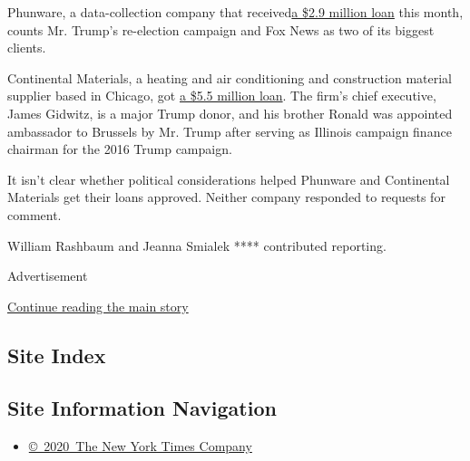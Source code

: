 Phunware, a data-collection company that
received\href{https://investors.phunware.com/news-events/press-releases/detail/96/phunware-receives-united-states-small-business}{a
\$2.9 million loan} this month, counts Mr. Trump's re-election campaign
and Fox News as two of its biggest clients.

Continental Materials, a heating and air conditioning and construction
material supplier based in Chicago, got
\href{https://www.sec.gov/Archives/edgar/data/24104/000110465920048601/tm2016372-1_8k.htm}{a
\$5.5 million loan}. The firm's chief executive, James Gidwitz, is a
major Trump donor, and his brother Ronald was appointed ambassador to
Brussels by Mr. Trump after serving as Illinois campaign finance
chairman for the 2016 Trump campaign.

It isn't clear whether political considerations helped Phunware and
Continental Materials get their loans approved. Neither company
responded to requests for comment.

William Rashbaum and Jeanna Smialek **** contributed reporting.

Advertisement

\protect\hyperlink{after-bottom}{Continue reading the main story}

\hypertarget{site-index}{%
\subsection{Site Index}\label{site-index}}

\hypertarget{site-information-navigation}{%
\subsection{Site Information
Navigation}\label{site-information-navigation}}

\begin{itemize}
\tightlist
\item
  \href{https://help.nytimes.com/hc/en-us/articles/115014792127-Copyright-notice}{©~2020~The
  New York Times Company}
\end{itemize}

